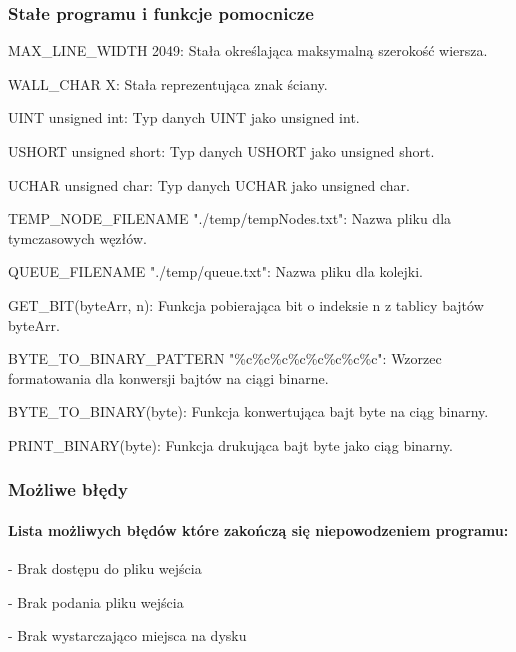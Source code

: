 \documentclass[
]{article}
\begin{document}
\hypertarget{staux142e-programu-i-funkcje-pomocnicze}{%
\subsubsection{Stałe programu i funkcje
pomocnicze}\label{staux142e-programu-i-funkcje-pomocnicze}}

MAX\_LINE\_WIDTH 2049: Stała określająca maksymalną szerokość wiersza.

WALL\_CHAR \textquotesingle X\textquotesingle: Stała reprezentująca znak
ściany.

UINT unsigned int: Typ danych UINT jako unsigned int.

USHORT unsigned short: Typ danych USHORT jako unsigned short.

UCHAR unsigned char: Typ danych UCHAR jako unsigned char.

TEMP\_NODE\_FILENAME "./temp/tempNodes.txt": Nazwa pliku dla
tymczasowych węzłów.

QUEUE\_FILENAME "./temp/queue.txt": Nazwa pliku dla kolejki.

GET\_BIT(byteArr, n): Funkcja pobierająca bit o indeksie n z tablicy
bajtów byteArr.

BYTE\_TO\_BINARY\_PATTERN "\%c\%c\%c\%c\%c\%c\%c\%c": Wzorzec
formatowania dla konwersji bajtów na ciągi binarne.

BYTE\_TO\_BINARY(byte): Funkcja konwertująca bajt byte na ciąg binarny.

PRINT\_BINARY(byte): Funkcja drukująca bajt byte jako ciąg binarny.

\hypertarget{moux17cliwe-bux142ux119dy}{%
\subsubsection{Możliwe błędy}\label{moux17cliwe-bux142ux119dy}}

\hypertarget{lista-moux17cliwych-bux142ux119duxf3w-ktuxf3re-zakoux144czux105-siux119-niepowodzeniem-programu}{%
\paragraph{Lista możliwych błędów które zakończą się niepowodzeniem
programu:}\label{lista-moux17cliwych-bux142ux119duxf3w-ktuxf3re-zakoux144czux105-siux119-niepowodzeniem-programu}}

- Brak dostępu do pliku wejścia

- Brak podania pliku wejścia

- Brak wystarczająco miejsca na dysku
\end{document}
